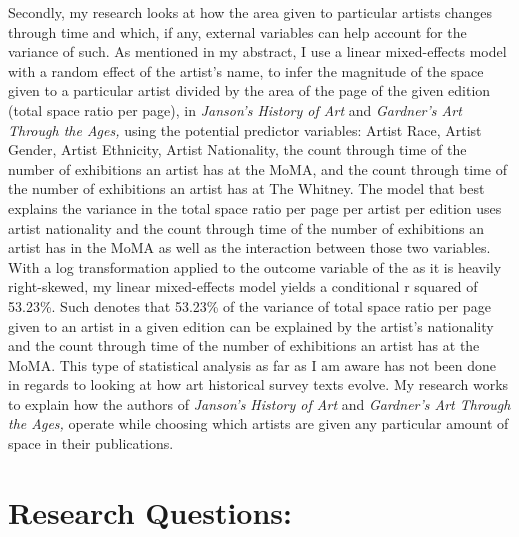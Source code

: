 \documentclass[
  letterpaper,
  DIV=11,
  numbers=noendperiod]{scrreprt}
\begin{document}
Secondly, my research looks at how the area given to particular artists
changes through time and which, if any, external variables can help
account for the variance of such. As mentioned in my abstract, I use a
linear mixed-effects model with a random effect of the artist's name, to
infer the magnitude of the space given to a particular artist divided by
the area of the page of the given edition (total space ratio per page),
in \emph{Janson's History of Art} and \emph{Gardner's Art Through the
Ages,} using the potential predictor variables: Artist Race, Artist
Gender, Artist Ethnicity, Artist Nationality, the count through time of
the number of exhibitions an artist has at the MoMA, and the count
through time of the number of exhibitions an artist has at The Whitney.
The model that best explains the variance in the total space ratio per
page per artist per edition uses artist nationality and the count
through time of the number of exhibitions an artist has in the MoMA as
well as the interaction between those two variables. With a log
transformation applied to the outcome variable of the as it is heavily
right-skewed, my linear mixed-effects model yields a conditional r
squared of 53.23\%. Such denotes that 53.23\% of the variance of total
space ratio per page given to an artist in a given edition can be
explained by the artist's nationality and the count through time of the
number of exhibitions an artist has at the MoMA. This type of
statistical analysis as far as I am aware has not been done in regards
to looking at how art historical survey texts evolve. My research works
to explain how the authors of \emph{Janson's History of Art} and
\emph{Gardner's Art Through the Ages,} operate while choosing which
artists are given any particular amount of space in their publications.

\hypertarget{research-questions}{%
\section{Research Questions:}\label{research-questions}}
\end{document}

